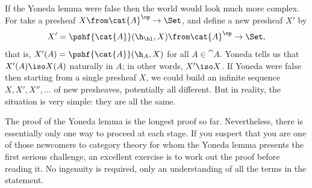 If the Yoneda lemma were false then the world would look much more complex.
For take a presheaf $X\from \cat{A}^\op \to \Set$, and define a new
presheaf $X'$ by
\[
X' = \pshf{\cat{A}}(\h_\bl, X)
\from 
\cat{A}^\op \to \Set,
\]
that is, $X'(A) = \pshf{\cat{A}}(\h_A, X)$ for all $A \in \cat{A}$.  Yoneda
tells us that $X'(A) \iso X(A)$ naturally in $A$; in other words, $X' \iso
X$.  If Yoneda were false then starting from a single presheaf $X$, we
could build an infinite sequence $X, X', X'', \ldots$ of new presheaves,
potentially all different.  But in reality, the situation is very simple:
they are all the same.

The proof of the Yoneda lemma is the longest proof so far.  Nevertheless,
there is essentially only one way to proceed at each stage.  If you suspect
that you are one of those newcomers to category theory for whom the Yoneda
lemma presents the first serious challenge, an excellent exercise is to
work out the proof before reading it.  No ingenuity is required, only an
understanding of all the terms in the statement.

